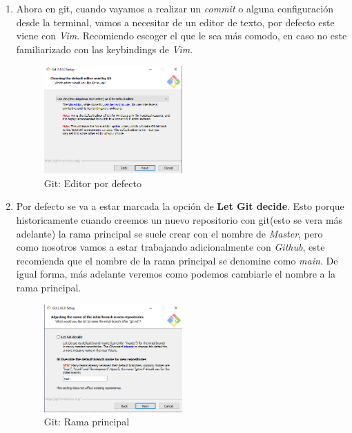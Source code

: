 \begin{enumerate}
	\item Ahora en git, cuando vayamos a realizar un \emph{commit} o alguna configuración desde la terminal, vamos a necesitar de un editor de texto, por defecto este viene con \emph{Vim}. Recomiendo escoger el que le sea más comodo, en caso no este familiarizado con las keybindings de \emph{Vim}.
	\begin{figure}[!h]
		\centering
		\includegraphics[width=0.5\textwidth]{01Instalacion/Imagenes/windows/instalacion07.png}
		\caption{Git: Editor por defecto }
		\label{fig:gitEditor}
	\end{figure}
	\newpage
	\item Por defecto se va a estar marcada la opción de \textbf{Let Git decide}. Esto porque historicamente cuando creemos un nuevo repositorio con git(esto se vera más adelante) la rama principal se suele crear con el nombre de \emph{Master}, pero como nosotros vamos a estar trabajando adicionalmente con \textit{Github}, este recomienda que el nombre de la rama principal se denomine como \emph{main}. De igual forma, más adelante veremos como podemos cambiarle el nombre a la rama principal.
	\begin{figure}[!h]
		\centering
		\includegraphics[width=0.5\textwidth]{01Instalacion/Imagenes/windows/instalacion08.png}
		\caption{Git: Rama principal}
		\label{fig:gitMainBranch}
	\end{figure}
	

\end{enumerate}
